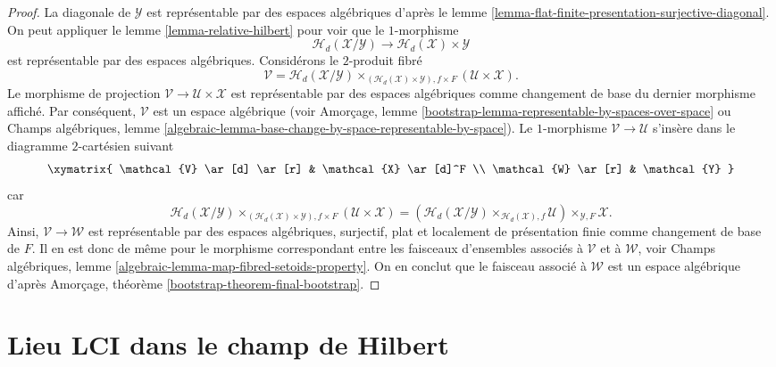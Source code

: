 \begin{proof}
\medskip\noindent
La diagonale de $\mathcal{Y}$ est représentable par des espaces algébriques d'après le
lemme \ref{lemma-flat-finite-presentation-surjective-diagonal}.
On peut appliquer le
lemme \ref{lemma-relative-hilbert}
pour voir que le $1$-morphisme
$$
\mathcal{H}_d(\mathcal{X}/\mathcal{Y})
\longrightarrow
\mathcal{H}_d(\mathcal{X}) \times \mathcal{Y}
$$
est représentable par des espaces algébriques. Considérons le $2$-produit fibré
$$
\mathcal{V} =
\mathcal{H}_d(\mathcal{X}/\mathcal{Y})
\times_{(\mathcal{H}_d(\mathcal{X}) \times \mathcal{Y}), f \times F}
(\mathcal{U} \times \mathcal{X}).
$$
Le morphisme de projection $\mathcal{V} \to \mathcal{U} \times \mathcal{X}$
est représentable par des espaces algébriques comme changement de base du dernier
morphisme affiché. Par conséquent, $\mathcal{V}$ est un espace algébrique (voir
Amorçage, lemme \ref{bootstrap-lemma-representable-by-spaces-over-space}
ou
Champs algébriques,
lemme \ref{algebraic-lemma-base-change-by-space-representable-by-space}).
Le $1$-morphisme $\mathcal{V} \to \mathcal{U}$ s'insère dans le diagramme
$2$-cartésien suivant
$$
\xymatrix{
\mathcal{V} \ar[d] \ar[r] & \mathcal{X} \ar[d]^F \\
\mathcal{W} \ar[r] & \mathcal{Y}
}
$$
car
$$
\mathcal{H}_d(\mathcal{X}/\mathcal{Y})
\times_{(\mathcal{H}_d(\mathcal{X}) \times \mathcal{Y}), f \times F}
(\mathcal{U} \times \mathcal{X})
=
(\mathcal{H}_d(\mathcal{X}/\mathcal{Y})
\times_{\mathcal{H}_d(\mathcal{X}), f}
\mathcal{U}) \times_{\mathcal{Y}, F} \mathcal{X}.
$$
Ainsi, $\mathcal{V} \to \mathcal{W}$ est représentable par des espaces algébriques,
surjectif, plat et localement de présentation finie comme changement de base
de $F$. Il en est donc de même pour le morphisme correspondant entre les faisceaux
d'ensembles associés à $\mathcal{V}$ et à $\mathcal{W}$, voir
Champs algébriques, lemme \ref{algebraic-lemma-map-fibred-setoids-property}.
On en conclut que le faisceau associé à $\mathcal{W}$ est un espace
algébrique d'après
Amorçage, théorème \ref{bootstrap-theorem-final-bootstrap}.
\end{proof}




\section{Lieu LCI dans le champ de Hilbert}
\label{section-lci}

